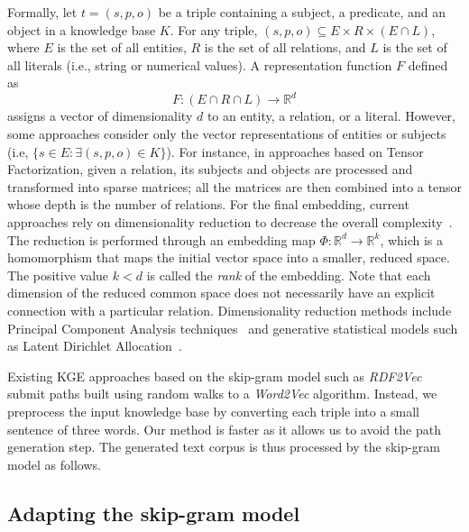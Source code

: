 \documentclass[graybox]{archivesofdatascience}
\newcommand{\wtv}{\textit{Word2Vec}\xspace}
\newcommand{\rtv}{\textit{RDF2Vec}\xspace}
\begin{document}
Formally, let $t = (s,p,o)$ be a triple containing a subject, a predicate, and an object in a knowledge base $K$.
For any triple, $(s,p,o) \subseteq E \times R \times (E \cap L)$, where $E$ is the set of all entities, $R$ is the set of all relations, and $L$ is the set of all literals (i.e., string or numerical values).
A representation function $F$ defined as
\begin{equation}
F : (E \cap R \cap L) \rightarrow \mathbb{R}^d
\end{equation}
assigns a vector of dimensionality $d$ to an entity, a relation, or a literal.
However, some approaches consider only the vector representations of entities or subjects (i.e, $\lbrace s \in E : \exists (s, p, o) \in K \rbrace$).
For instance, in approaches based on Tensor Factorization, given a relation, its subjects and objects are processed and transformed into sparse matrices; all the matrices are then combined into a tensor whose depth is the number of relations.
For the final embedding, current approaches rely on dimensionality reduction to decrease the overall complexity~\citep{nickel2014reducing,TransA/jia2015locally,TransR/lin2015learning}.
The reduction is performed through an embedding map $\Phi : \mathbb{R}^d \rightarrow \mathbb{R}^k$, which is a homomorphism that maps the initial vector space into a smaller, reduced space.
The positive value $k < d$ is called the \textit{rank} of the embedding.
Note that each dimension of the reduced common space does not necessarily have an explicit connection with a particular relation.
Dimensionality reduction methods include Principal Component Analysis techniques~\citep{nickel2014reducing} and generative statistical models such as Latent Dirichlet Allocation~\citep{Sspace/jurgens2010s,Gensim/rehurek_lrec}.


Existing KGE approaches based on the skip-gram model such as \rtv~\citep{ristoski2016rdf2vec} submit paths built using random walks to a \wtv algorithm.
Instead, we preprocess the input knowledge base by converting each triple into a small sentence of three words.
Our method is faster as it allows us to avoid the path generation step.
The generated text corpus is thus processed by the skip-gram model as follows.

\subsection{Adapting the skip-gram model}
\end{document}
